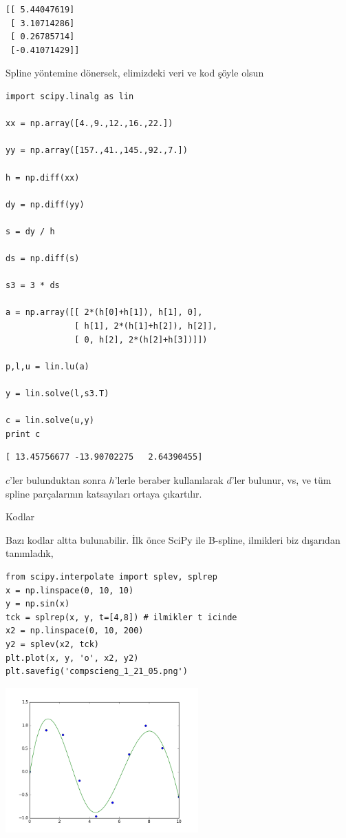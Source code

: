 \documentclass[12pt,fleqn]{article}\usepackage{../../common}
\begin{document}
\begin{verbatim}
[[ 5.44047619]
 [ 3.10714286]
 [ 0.26785714]
 [-0.41071429]]
\end{verbatim}

Spline yöntemine dönersek, elimizdeki veri ve kod şöyle olsun

\begin{verbatim}
import scipy.linalg as lin

xx = np.array([4.,9.,12.,16.,22.])

yy = np.array([157.,41.,145.,92.,7.])

h = np.diff(xx)

dy = np.diff(yy)

s = dy / h

ds = np.diff(s)

s3 = 3 * ds

a = np.array([[ 2*(h[0]+h[1]), h[1], 0],
              [ h[1], 2*(h[1]+h[2]), h[2]],
              [ 0, h[2], 2*(h[2]+h[3])]])

p,l,u = lin.lu(a)

y = lin.solve(l,s3.T)

c = lin.solve(u,y)
print c
\end{verbatim}

\begin{verbatim}
[ 13.45756677 -13.90702275   2.64390455]
\end{verbatim}

$c$'ler bulunduktan sonra $h$'lerle beraber kullanılarak $d$'ler bulunur,
vs, ve tüm spline parçalarının katsayıları ortaya çıkartılır.

Kodlar

Bazı kodlar altta bulunabilir. İlk önce SciPy ile B-spline, ilmikleri biz
dışarıdan tanımladık, 

\begin{verbatim}
from scipy.interpolate import splev, splrep
x = np.linspace(0, 10, 10)
y = np.sin(x)
tck = splrep(x, y, t=[4,8]) # ilmikler t icinde
x2 = np.linspace(0, 10, 200)
y2 = splev(x2, tck)
plt.plot(x, y, 'o', x2, y2)
plt.savefig('compscieng_1_21_05.png')
\end{verbatim}

\includegraphics[width=20em]{compscieng_1_21_05.png}
\end{document}
